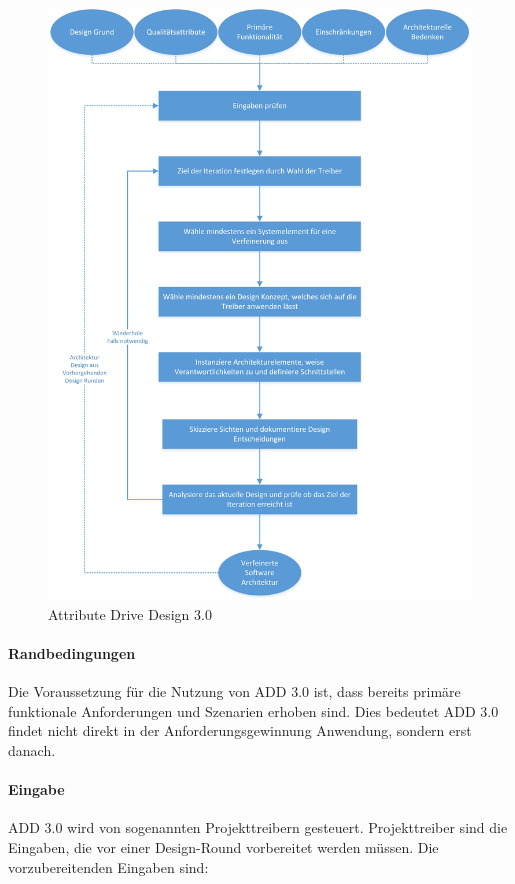 \begin{figure}[h]
	\centering
	\includegraphics[scale=0.45]{add3.jpg} 
	\caption{Attribute Drive Design 3.0}\label{fig_add3}
\end{figure}

\paragraph{Randbedingungen}
Die Voraussetzung f\"ur die Nutzung von ADD 3.0 ist, dass bereits prim\"are funktionale Anforderungen und Szenarien erhoben sind. Dies bedeutet ADD 3.0 findet nicht direkt in der Anforderungsgewinnung Anwendung, sondern erst danach. \\

\paragraph{Eingabe}
ADD 3.0 wird von sogenannten Projekttreibern gesteuert. Projekttreiber sind die Eingaben, die vor einer Design-Round vorbereitet werden m\"ussen. Die vorzubereitenden Eingaben sind:\\

